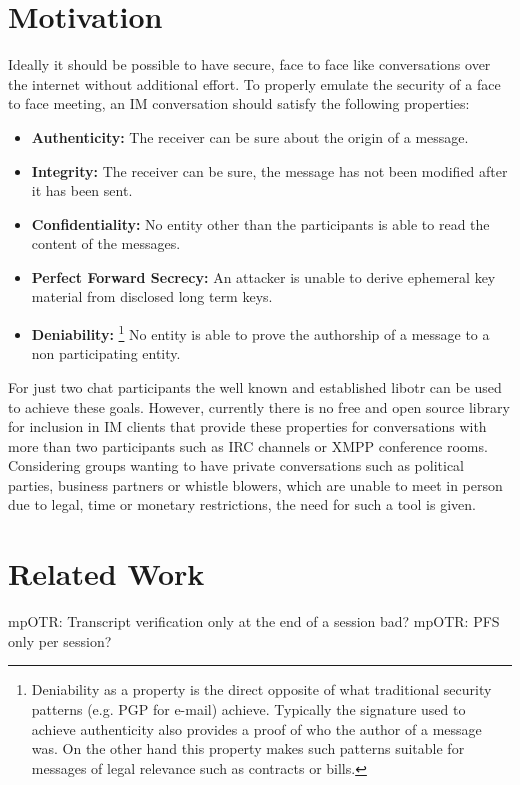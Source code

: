 \section{Motivation}
Ideally it should be possible to have secure, face to face like conversations over the internet without additional effort. To properly emulate the security of a face to face meeting, an IM conversation should satisfy the following properties:
\begin{itemize}
	\item{\textbf{Authenticity:} The receiver can be sure about the origin of a message.}
	\item{\textbf{Integrity:} The receiver can be sure, the message has not been modified after it has been sent.}
	\item{\textbf{Confidentiality:} No entity other than the participants is able to read the content of the messages.}
	\item{\textbf{Perfect Forward Secrecy:} An attacker is unable to derive ephemeral key material from disclosed long term keys.}
	\item{\textbf{Deniability:} \footnote{Deniability as a property is the direct opposite of what traditional security patterns (e.g. PGP for e-mail) achieve. Typically the signature used to achieve authenticity also provides a proof of who the author of a message was. On the other hand this property makes such patterns suitable for messages of legal relevance such as contracts or bills.} No entity is able to prove the authorship of a message to a non participating entity.}
\end{itemize}

For just two chat participants the well known and established libotr can be used
to achieve these goals. However, currently there is no free and open source
library for inclusion in IM clients that provide these properties for
conversations with more than two participants such as IRC channels or XMPP
conference rooms. Considering groups wanting to have private conversations such
as political parties, business partners or whistle blowers, which are unable to
meet in person due to legal, time or monetary restrictions, the need for such a
tool is given.

\section{Related Work}

mpOTR: Transcript verification only at the end of a session bad?
mpOTR: PFS only per session?

